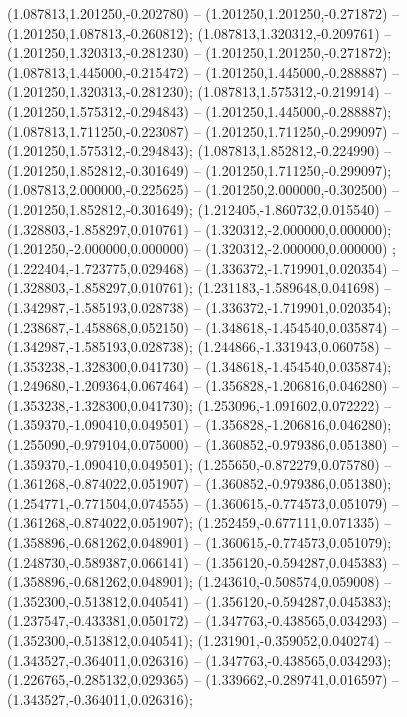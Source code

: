  (1.087813,1.201250,-0.202780) -- (1.201250,1.201250,-0.271872) -- (1.201250,1.087813,-0.260812);
 (1.087813,1.320312,-0.209761) -- (1.201250,1.320313,-0.281230) -- (1.201250,1.201250,-0.271872);
 (1.087813,1.445000,-0.215472) -- (1.201250,1.445000,-0.288887) -- (1.201250,1.320313,-0.281230);
 (1.087813,1.575312,-0.219914) -- (1.201250,1.575312,-0.294843) -- (1.201250,1.445000,-0.288887);
 (1.087813,1.711250,-0.223087) -- (1.201250,1.711250,-0.299097) -- (1.201250,1.575312,-0.294843);
 (1.087813,1.852812,-0.224990) -- (1.201250,1.852812,-0.301649) -- (1.201250,1.711250,-0.299097);
 (1.087813,2.000000,-0.225625) -- (1.201250,2.000000,-0.302500) -- (1.201250,1.852812,-0.301649);
 (1.212405,-1.860732,0.015540) -- (1.328803,-1.858297,0.010761) -- (1.320312,-2.000000,0.000000);
 (1.201250,-2.000000,0.000000) -- (1.320312,-2.000000,0.000000) ;
 (1.222404,-1.723775,0.029468) -- (1.336372,-1.719901,0.020354) -- (1.328803,-1.858297,0.010761);
 (1.231183,-1.589648,0.041698) -- (1.342987,-1.585193,0.028738) -- (1.336372,-1.719901,0.020354);
 (1.238687,-1.458868,0.052150) -- (1.348618,-1.454540,0.035874) -- (1.342987,-1.585193,0.028738);
 (1.244866,-1.331943,0.060758) -- (1.353238,-1.328300,0.041730) -- (1.348618,-1.454540,0.035874);
 (1.249680,-1.209364,0.067464) -- (1.356828,-1.206816,0.046280) -- (1.353238,-1.328300,0.041730);
 (1.253096,-1.091602,0.072222) -- (1.359370,-1.090410,0.049501) -- (1.356828,-1.206816,0.046280);
 (1.255090,-0.979104,0.075000) -- (1.360852,-0.979386,0.051380) -- (1.359370,-1.090410,0.049501);
 (1.255650,-0.872279,0.075780) -- (1.361268,-0.874022,0.051907) -- (1.360852,-0.979386,0.051380);
 (1.254771,-0.771504,0.074555) -- (1.360615,-0.774573,0.051079) -- (1.361268,-0.874022,0.051907);
 (1.252459,-0.677111,0.071335) -- (1.358896,-0.681262,0.048901) -- (1.360615,-0.774573,0.051079);
 (1.248730,-0.589387,0.066141) -- (1.356120,-0.594287,0.045383) -- (1.358896,-0.681262,0.048901);
 (1.243610,-0.508574,0.059008) -- (1.352300,-0.513812,0.040541) -- (1.356120,-0.594287,0.045383);
 (1.237547,-0.433381,0.050172) -- (1.347763,-0.438565,0.034293) -- (1.352300,-0.513812,0.040541);
 (1.231901,-0.359052,0.040274) -- (1.343527,-0.364011,0.026316) -- (1.347763,-0.438565,0.034293);
 (1.226765,-0.285132,0.029365) -- (1.339662,-0.289741,0.016597) -- (1.343527,-0.364011,0.026316);
